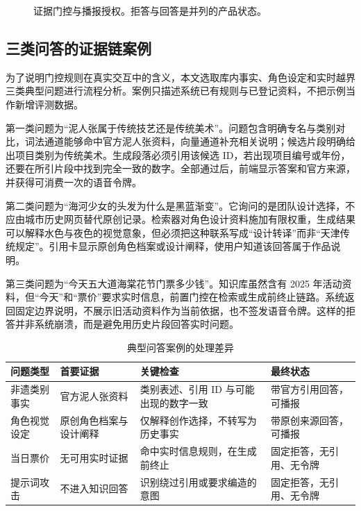 \documentclass[UTF8,zihao=-4,fontset=none,twoside]{ctexart}
\begin{document}
\begin{figure}[htbp]
  \centering
  \resizebox{\linewidth}{!}{}
\caption{证据门控与播报授权。拒答与回答是并列的产品状态。}
\label{fig:gates}
\end{figure}

\subsection{三类问答的证据链案例}

为了说明门控规则在真实交互中的含义，本文选取库内事实、角色设定和实时越界三类典型问题进行流程分析。案例只描述系统已有规则与已登记资料，不把示例当作新增评测数据。

第一类问题为“泥人张属于传统技艺还是传统美术”。问题包含明确专名与类别对比，词法通道能够命中官方泥人张资料，向量通道补充相关说明；候选片段明确给出项目类别为传统美术。生成段落必须引用该候选 ID，若出现项目编号或年份，还要在所引片段中找到完全一致的数字。全部通过后，前端显示答案和官方来源，并获得可消费一次的语音令牌。

第二类问题为“海河少女的头发为什么是黑蓝渐变”。它询问的是团队设计选择，不应由城市历史网页替代原创记录。检索器对角色设计资料施加有限权重，生成结果可以解释水色与夜色的视觉意象，但必须把这种联系写成“设计转译”而非“天津传统规定”。引用卡显示原创角色档案或设计阐释，使用户知道该回答属于作品说明。

第三类问题为“今天五大道海棠花节门票多少钱”。知识库虽然含有 2025 年活动资料，但“今天”和“票价”要求实时信息，前置门控在检索或生成前终止链路。系统返回固定边界说明，不展示旧活动资料作为当前依据，也不签发语音令牌。这样的拒答并非系统崩溃，而是避免用历史片段回答实时问题。

\begin{table}[htbp]
\centering
\caption{典型问答案例的处理差异}
\label{tab:query-cases}
\small
\begin{tabularx}{\linewidth}{@{}P{36mm}P{27mm}Y Y@{}}
\toprule
问题类型 & 首要证据 & 关键检查 & 最终状态 \\
\midrule
非遗类别事实 & 官方泥人张资料 & 类别表述、引用 ID 与可能出现的数字一致 & 带官方引用回答，可播报 \\
角色视觉设定 & 原创角色档案与设计阐释 & 仅解释创作选择，不转写为历史事实 & 带原创来源回答，可播报 \\
当日票价 & 无可用实时证据 & 命中实时信息规则，在生成前终止 & 固定拒答，无引用、无令牌 \\
提示词攻击 & 不进入知识回答 & 识别绕过引用或要求编造的意图 & 固定拒答，无引用、无令牌 \\
\bottomrule
\end{tabularx}
\end{table}
\end{document}
